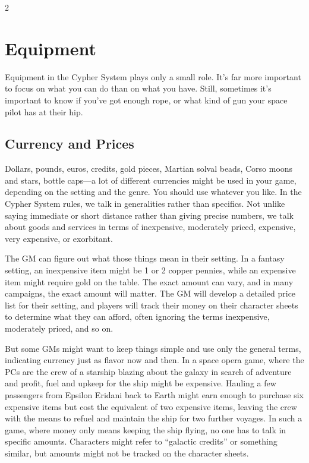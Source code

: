 \begin{multicols}{2}

\chapter{Equipment}

Equipment in the Cypher System plays only a small role. It’s far more important to focus on what you can do than on what you have. Still, sometimes it’s important to know if you’ve got enough rope, or what kind of gun your space pilot has at their hip.

\section{Currency and Prices}

Dollars, pounds, euros, credits, gold pieces, Martian solval beads, Corso moons and stars, bottle caps—a lot of different currencies might be used in your game, depending on the setting and the genre. You should use whatever you like. In the Cypher System rules, we talk in generalities rather than specifics. Not unlike saying immediate or short distance rather than giving precise numbers, we talk about goods and services in terms of inexpensive, moderately priced, expensive, very expensive, or exorbitant.

The GM can figure out what those things mean in their setting. In a fantasy setting, an inexpensive item might be 1 or 2 copper pennies, while an expensive item might require gold on the table. The exact amount can vary, and in many campaigns, the exact amount will matter. The GM will develop a detailed price list for their setting, and players will track their money on their character sheets to determine what they can afford, often ignoring the terms inexpensive, moderately priced, and so on.

But some GMs might want to keep things simple and use only the general terms, indicating currency just as flavor now and then. In a space opera game, where the PCs are the crew of a starship blazing about the galaxy in search of adventure and profit, fuel and upkeep for the ship might be expensive. Hauling a few passengers from Epsilon Eridani back to Earth might earn enough to purchase six expensive items but cost the equivalent of two expensive items, leaving the crew with the means to refuel and maintain the ship for two further voyages. In such a game, where money only means keeping the ship flying, no one has to talk in specific amounts. Characters might refer to “galactic credits” or something similar, but amounts might not be tracked on the character sheets.


\end{multicols}
